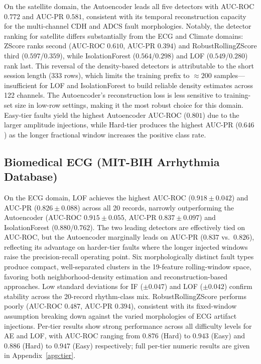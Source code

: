 \documentclass[conference]{IEEEtran}
\begin{document}
On the satellite domain, the Autoencoder leads all five detectors with AUC-ROC $0.772$ and AUC-PR $0.581$, consistent with its temporal reconstruction capacity for the multi-channel CDH and ADCS fault morphologies. Notably, the detector ranking for satellite differs substantially from the ECG and Climate domains: ZScore ranks second (AUC-ROC $0.610$, AUC-PR $0.394$) and RobustRollingZScore third ($0.597$/$0.359$), while IsolationForest ($0.564$/$0.298$) and LOF ($0.549$/$0.280$) rank last. This reversal of the density-based detectors is attributable to the short session length (333 rows), which limits the training prefix to $\approx\!200$ samples---insufficient for LOF and IsolationForest to build reliable density estimates across 122 channels. The Autoencoder's reconstruction loss is less sensitive to training-set size in low-row settings, making it the most robust choice for this domain. Easy-tier faults yield the highest Autoencoder AUC-ROC ($0.801$) due to the larger amplitude injections, while Hard-tier produces the highest AUC-PR ($0.646$) as the longer fractional window increases the positive class rate.

\subsection{Biomedical ECG (MIT-BIH Arrhythmia Database)}

On the ECG domain, LOF achieves the highest AUC-ROC ($0.918 \pm 0.042$) and AUC-PR ($0.826 \pm 0.088$) across all 20 records, narrowly outperforming the Autoencoder (AUC-ROC $0.915 \pm 0.055$, AUC-PR $0.837 \pm 0.097$) and IsolationForest ($0.880$/$0.762$). The two leading detectors are effectively tied on AUC-ROC, but the Autoencoder marginally leads on AUC-PR ($0.837$ vs.\ $0.826$), reflecting its advantage on harder-tier faults where the longer injected windows raise the precision-recall operating point. Six morphologically distinct fault types produce compact, well-separated clusters in the 19-feature rolling-window space, favoring both neighborhood-density estimation and reconstruction-based approaches. Low standard deviations for IF ($\pm 0.047$) and LOF ($\pm 0.042$) confirm stability across the 20-record rhythm-class mix. RobustRollingZScore performs poorly (AUC-ROC $0.487$, AUC-PR $0.394$), consistent with its fixed-window assumption breaking down against the varied morphologies of ECG artifact injections. Per-tier results show strong performance across all difficulty levels for AE and LOF, with AUC-ROC ranging from $0.876$ (Hard) to $0.943$ (Easy) and $0.886$ (Hard) to $0.947$ (Easy) respectively; full per-tier numeric results are given in Appendix~\ref{app:tier}.
\end{document}
